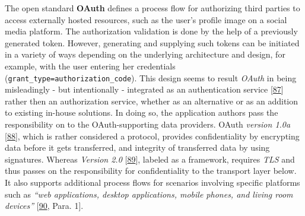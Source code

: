 \documentclass[12pt,english,a4paper,titlepage,cleardoublepage=empty,dottedtoc]{report}
\begin{document}
The open standard \textbf{\protect\hypertarget{def--oauth}{}{OAuth}}
defines a process flow for authorizing third parties to access
externally hosted resources, such as the user's profile image on a
social media platform. The authorization validation is done by the help
of a previously generated token. However, generating and supplying such
tokens can be initiated in a variety of ways depending on the underlying
architecture and design, for example, with the user entering her
credentials (\texttt{grant\_type=authorization\_code}). This design
seems to result \emph{OAuth} in being misleadingly - but intentionally -
integrated as an authentication service
{[}\protect\hyperlink{ref-web_2012_problem-with-oauth-for-authentication}{87}{]}
rather then an authorization service, whether as an alternative or as an
addition to existing in-house solutions. In doing so, the application
authors pass the responsibility on to the OAuth-supporting data
providers. OAuth \emph{version 1.0a}
{[}\protect\hyperlink{ref-web_spec_oauth-1a}{88}{]}, which is rather
considered a protocol, provides confidentiality by encrypting data
before it gets transferred, and integrity of transferred data by using
signatures. Whereas \emph{Version 2.0}
{[}\protect\hyperlink{ref-web_spec_oauth-2}{89}{]}, labeled as a
framework, requires \emph{TLS} and thus passes on the responsibility for
confidentiality to the transport layer below. It also supports
additional process flows for scenarios involving specific platforms such
as \emph{``web applications, desktop applications, mobile phones, and
living room devices''} {[}\protect\hyperlink{ref-web_2016_oauth-2}{90},
Para. 1{]}.
\end{document}
